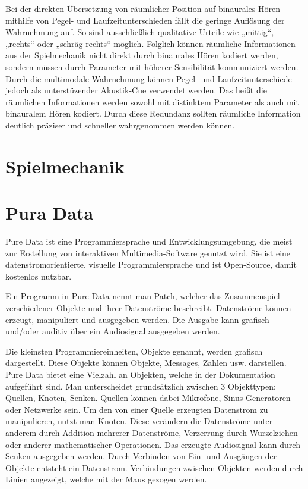 \documentclass[a4paper, 11pt]{scrartcl}
\begin{document}
Bei der direkten Übersetzung von räumlicher Position auf binaurales Hören
mithilfe von Pegel- und Laufzeitunterschieden fällt die geringe Auflösung der
Wahrnehmung auf. So sind ausschließlich qualitative Urteile wie „mittig“,
„rechts“ oder „schräg rechts“ möglich. Folglich können räumliche Informationen
aus der Spielmechanik nicht direkt durch binaurales Hören kodiert werden,
sondern müssen durch Parameter mit höherer Sensibilität kommuniziert werden.
Durch die multimodale Wahrnehmung können Pegel- und Laufzeitunterschiede jedoch
als unterstüzender Akustik-Cue verwendet werden. Das heißt die räumlichen
Informationen werden sowohl mit distinktem Parameter als auch mit binauralem
Hören kodiert. Durch diese Redundanz sollten räumliche Information deutlich
präziser und schneller wahrgenommen werden können.

\section{Spielmechanik}
\label{sec:spielmechanik}

\section{Pura Data}
\label{sec:Pure Data}

Pure Data ist eine Programmiersprache und Entwicklungsumgebung, die meist zur
Erstellung von interaktiven Multimedia-Software genutzt wird. Sie ist eine
datenstromorientierte, visuelle Programmiersprache und ist Open-Source, damit
kostenlos nutzbar.

Ein Programm in Pure Data nennt man Patch, welcher das Zusammenspiel
verschiedener Objekte und ihrer Datenströme beschreibt. Datenströme können
erzeugt, manipuliert und ausgegeben werden. Die Ausgabe kann grafisch und/oder
auditiv über ein Audiosignal ausgegeben werden.  

Die kleinsten Programmiereinheiten, Objekte genannt, werden grafisch
dargestellt. Diese Objekte können Objekte, Messages, Zahlen usw. darstellen.
Pure Data bietet eine Vielzahl an Objekten, welche in der Dokumentation
aufgeführt sind. Man unterscheidet grundsätzlich zwischen 3 Objekttypen:
Quellen, Knoten, Senken. Quellen können dabei Mikrofone, Sinus-Generatoren oder
Netzwerke sein. Um den von einer Quelle erzeugten Datenstrom zu manipulieren,
nutzt man Knoten. Diese verändern die Datenströme unter anderem durch Addition
mehrerer Datenströme, Verzerrung durch Wurzelziehen oder anderer mathematischer
Operationen. Das erzeugte Audiosignal kann durch Senken ausgegeben werden. Durch
Verbinden von Ein- und Ausgängen der Objekte entsteht ein Datenstrom.
Verbindungen zwischen Objekten werden durch Linien angezeigt, welche mit der
Maus gezogen werden. 
\end{document}
